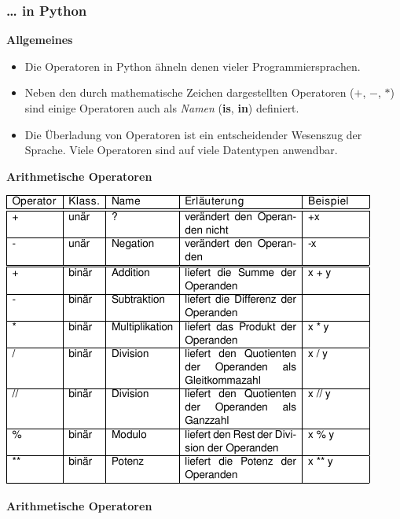 \subsubsection{\ldots{} in Python}

\vspace{0.5cm}\par\noindent\textbf{Allgemeines}\vspace{0.5cm}

\begin{itemize}
\itemsep1pt\parskip0pt
\item
  {Die Operatoren in Python ähneln denen vieler Programmiersprachen.}
\item
  {Neben den durch mathematische Zeichen dargestellten Operatoren
  ($+$, $-$, $*$) sind einige Operatoren auch als \emph{Namen}
  (\textbf{is}, \textbf{in}) definiert.}
\item
  {Die Überladung von Operatoren ist ein entscheidender Wesenszug der
  Sprache. Viele Operatoren sind auf viele Datentypen anwendbar.}
\end{itemize}




\vspace{0.5cm}\par\noindent\textbf{Arithmetische Operatoren}\vspace{0.5cm}

\includegraphics[width=\textwidth]{img/operatoren.pdf}




\vspace{0.5cm}\par\noindent\textbf{Arithmetische Operatoren}\vspace{0.5cm}

